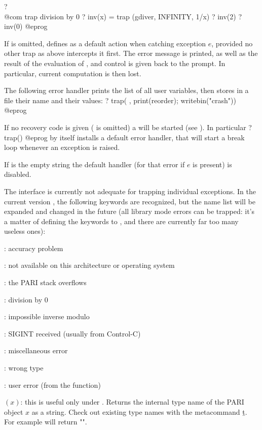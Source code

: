 \bprog
? \\@com trap division by 0
? inv(x) = trap (gdiver, INFINITY, 1/x)
? inv(2)
? inv(0)
@eprog

If  is omitted, defines  as a default action when
catching exception $e$, provided no other trap as above intercepts it first.
The error message is printed, as well as the result of the evaluation of
, and control is given back to the  prompt. In particular, current
computation is then lost.

The following error handler prints the list of all user variables, then
stores in a file their name and their values:
\bprog
? { trap( ,
      print(reorder);
      writebin("crash")) }
@eprog

If no recovery code is given ( is omitted) a  will
be started (see ). In particular
\bprog
? trap()
@eprog\noindent
by itself installs a default error handler, that will start a break
loop whenever an exception is raised.

If  is the empty string  the default handler (for that error
if $e$ is present) is disabled.

 The interface is currently not adequate for trapping
individual exceptions. In the current version \vers, the following keywords
are recognized, but the name list will be expanded and changed in the
future (all library mode errors can be trapped: it's a matter of defining
the keywords to , and there are currently far too many useless ones):

: accuracy problem

: not available on this architecture or operating system

: the PARI stack overflows

: division by 0

: impossible inverse modulo

: SIGINT received (usually from Control-C)

: miscellaneous error

: wrong type

: user error (from the  function)

$(x)$: this is useful only under . Returns the
internal type name of the PARI object $x$ as a  string. Check out
existing type names with the metacommand \b{t}.\label{se:gptype}
For example  will return "".

